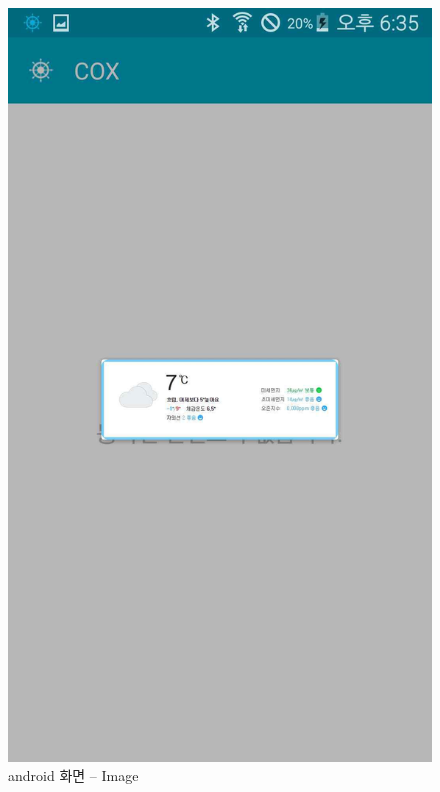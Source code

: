 \documentclass[chapter,oneside]{oblivoir}
\begin{document}
\begin{enumerate}
    \begin{figure}[h!]
    \centering
    \includegraphics{pic/chp7/img1028}
    \caption{android 화면 – Image}
    \end{figure}


\end{enumerate}
\end{document}
